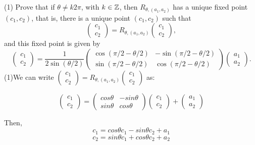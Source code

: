 \documentclass[12pt]{article}
\begin{document}
\medskip
(1)
Prove that if $\theta\not= k 2\pi$, with $k \in \mathbb{Z}$, then  
$R_{\theta, (a_1,a_2)}$ has
a unique fixed point $(c_1, c_2)$, that is, there is a unique
point  $(c_1, c_2)$ such that
\[
\begin{pmatrix}
c_1 \\
c_2
\end{pmatrix} 
=
R_{\theta, (a_1,a_2)}
\begin{pmatrix}
c_1 \\
c_2
\end{pmatrix}, 
\]
and  this fixed point is given by
\[
\begin{pmatrix}
c_1 \\
c_2
\end{pmatrix} 
=
\frac{1}{2\sin(\theta/2)}
\begin{pmatrix}
\cos(\pi/2 - \theta/2) & -\sin(\pi/2 - \theta/2) \\
\sin(\pi/2 -\theta/2) & \cos(\pi/2 - \theta/2)
\end{pmatrix}
\begin{pmatrix}
a_1 \\
a_2
\end{pmatrix}.
\]
(1)We can write 
$\begin{pmatrix}
c_1\\
c_2
\end{pmatrix} = R_{\theta,(a_1,a_2)} \begin{pmatrix}
c_1\\
c_2
\end{pmatrix}$ as:

\vspace{0.25cm}
 \[\begin{pmatrix}
c_1\\
c_2
\end{pmatrix}= \begin{pmatrix}
  cos\theta & -sin\theta\\
  sin\theta & cos\theta
  \end{pmatrix}\begin{pmatrix}
c_1\\
c_2
\end{pmatrix} +\begin{pmatrix}
a_1\\
a_2
\end{pmatrix}\]
  
Then,
\begin{equation}
c_1 = cos\theta c_1 - sin\theta c_2 + a_1 \end{equation}
\begin{equation} c_2 = sin\theta c_1 + cos\theta c_2 + a_2 \end{equation}
\end{document}
